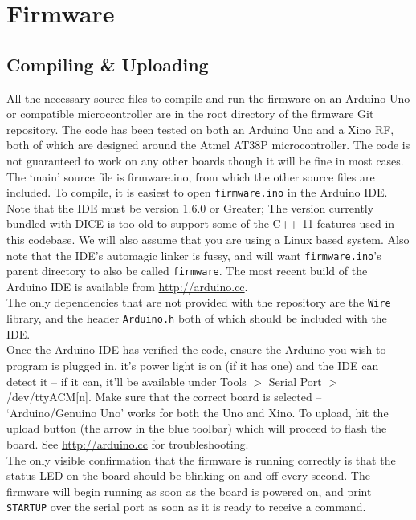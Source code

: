 %
%

\section{Firmware}

\subsection{Compiling \& Uploading}

All the necessary source files to compile and run the firmware on an Arduino Uno or compatible microcontroller are in the root directory of the firmware Git repository. The code has been tested on both an Arduino Uno and a Xino RF, both of which are designed around the Atmel AT38P microcontroller. The code is not guaranteed to work on any other boards though it will be fine in most cases.\\

The `main' source file is firmware.ino, from which the other source files are included. To compile, it is easiest to open \texttt{firmware.ino} in the Arduino IDE. Note that the IDE must be version 1.6.0 or Greater; The version currently bundled with DICE is too old to support some of the C++ 11 features used in this codebase. We will also assume that you are using a Linux based system. Also note that the IDE's automagic linker is fussy, and will want \texttt{firmware.ino}'s parent directory to also be called \texttt{firmware}. The most recent build of the Arduino IDE is available from \href{http://arduino.cc}{http://arduino.cc}.\\

The only dependencies that are not provided with the repository are the \verb|Wire| library, and the header \verb|Arduino.h| both of which should be included with the IDE.\\

Once the Arduino IDE has verified the code, ensure the Arduino you wish to program is plugged in, it's power light is on (if it has one) and the IDE can detect it -- if it can, it'll be available under Tools $>$ Serial Port $>$ /dev/ttyACM[n]. Make sure that the correct board is selected -- `Arduino/Genuino Uno' works for both the Uno and Xino. To upload, hit the upload button (the arrow in the blue toolbar) which will proceed to flash the board. See \href{http://arduino.cc}{http://arduino.cc} for troubleshooting.\\

The only visible confirmation that the firmware is running correctly is that the status LED on the board should be blinking on and off every second. The firmware will begin running as soon as the board is powered on, and print \texttt{STARTUP} over the serial port as soon as it is ready to receive a command.


